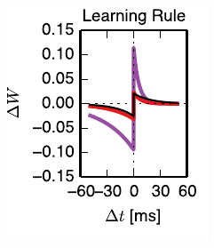 \begin{figure}[t!]
\begin{subfigure}[T]{2.4in}
    \label{fig:fig4_add_nothr_trajectory}
  \end{subfigure}
  \begin{subfigure}[T]{1.45in}
    \includegraphics[width=\textwidth]{figures/ch6/fig4_add_thr_stdp_rule}    
    \label{fig:fig4_add_nothr_stdp_rule}
  \end{subfigure}
  \begin{subfigure}[T]{1.45in}
    \hspace{.1in}

\end{subfigure}
\end{figure}
